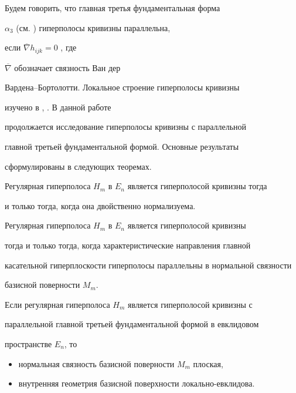 Будем говорить, что главная третья фундаментальная форма


$\alpha_3$ (см. \cite{chak4}) гиперполосы кривизны параллельна,


если $\overline{\nabla}h_{ijk}=0$ \cite{chak5}, где


$\overline{\nabla}$ обозначает связность Ван дер


Вардена--Бортолотти. Локальное строение гиперполосы кривизны


изучено в \cite{chak3}, \cite{chak6}. В данной работе


продолжается исследование гиперполосы кривизны с параллельной


главной третьей фундаментальной формой. Основные результаты


сформулированы в следующих теоремах.





\begin{thm}


Регулярная гиперполоса $H_m$ в $E_n$ является гиперполосой кривизны тогда 


и только тогда, когда она двойственно нормализуема.


\end{thm}





\begin{thm}


Регулярная гиперполоса $H_m$ в $E_n$ является гиперполосой кривизны 


тогда и только тогда, когда характеристические направления главной 


касательной гиперплоскости гиперполосы параллельны в нормальной связности 


базисной поверности $M_m$.


\end{thm}





\begin{thm}


Если регулярная гиперполоса $H_m$ является гиперполосой кривизны с 


параллельной главной третьей фундаментальной формой в евклидовом 


пространстве $E_n$, то


\begin{itemize}


\item[1)] нормальная связность базисной поверности $M_m$ плоская,


\item[2)] внутренняя геометрия базисной поверхности локально-евклидова.


\end{itemize}


\end{thm}








